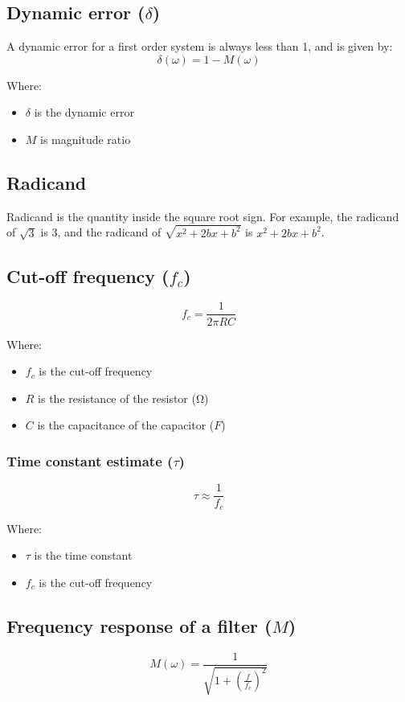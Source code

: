\documentclass[11pt]{article}
\begin{document}
\subsection{Dynamic error (\(\delta\))}
\label{sec:org0f12225}
A dynamic error for a first order system is always less than 1, and is given by:
\[\delta(\omega) = 1 - M(\omega)\]

Where:
\begin{itemize}
\item \(\delta\) is the dynamic error
\item \(M\) is magnitude ratio
\end{itemize}
\subsection{Radicand}
\label{sec:org8e19fa3}
Radicand is the quantity inside the square root sign. For example, the radicand of \(\sqrt{3}\) is 3, and the radicand of \(\sqrt{x^2 + 2bx + b^2}\) is \(x^2 + 2bx + b^2\).
\subsection{Cut-off frequency (\(f_c\))}
\label{sec:org4ed35b0}
\[f_c = \frac{1}{2 \pi RC}\]

Where:
\begin{itemize}
\item \(f_c\) is the cut-off frequency
\item \(R\) is the resistance of the resistor (\(\unit{\ohm}\))
\item \(C\) is the capacitance of the capacitor (\(\unit{F}\))
\end{itemize}
\subsubsection{Time constant estimate (\(\tau\))}
\label{sec:org74e37de}
\[\tau \approx \frac{1}{f_c}\]

Where:
\begin{itemize}
\item \(\tau\) is the time constant
\item \(f_c\) is the cut-off frequency
\end{itemize}
\subsection{Frequency response of a filter (\(M\))}
\label{sec:org7d5ad46}
\[M(\omega) = \frac{1}{\sqrt{1 + \left(\frac{f}{f_c} \right)^2}}\]
\end{document}
